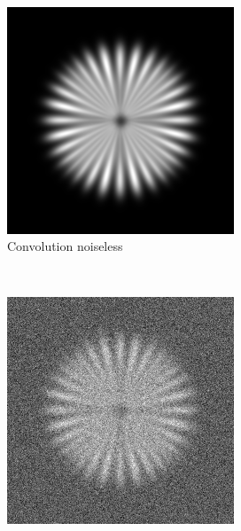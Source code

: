 \documentclass{./packages/optica-article}
\begin{document}
\begin{figure}[hbp]
	\begin{center}
		\,\hfill
		\begin{subfigure}[t]{0.25\textwidth}\centering
			\centering
			\includegraphics[width=\textwidth]{Simulation deconvolution/ref_conv}
			\caption{Convolution noiseless}\label{fig:sim:conv}
		\end{subfigure}
		\,\hfill
		\begin{subfigure}[t]{0.25\textwidth}\centering
			\centering
			\includegraphics[width=\textwidth]{Simulation deconvolution/ref_ng_0.1}

\end{subfigure}
\end{center}
\end{figure}
\end{document}
